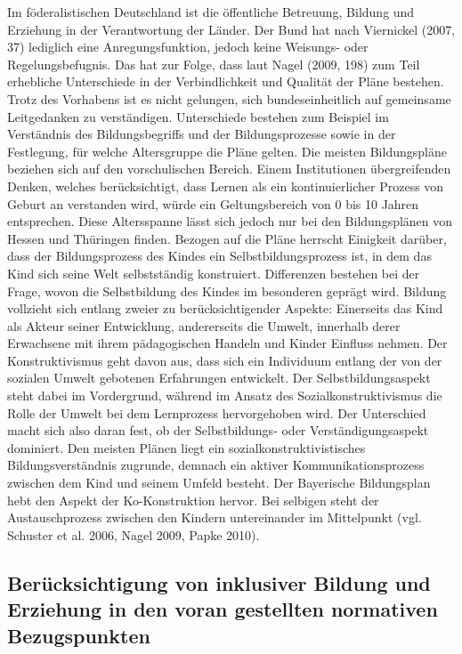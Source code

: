 Im föderalistischen Deutschland ist die öffentliche Betreuung, Bildung und Erziehung in der Verantwortung der Länder. Der Bund hat nach Viernickel (2007, 37) lediglich eine Anregungsfunktion, jedoch keine Weisungs- oder Regelungsbefugnis. Das hat zur Folge, dass laut Nagel (2009, 198) zum Teil erhebliche Unterschiede in der Verbindlichkeit und Qualität der Pläne bestehen. Trotz des Vorhabens ist es nicht gelungen, sich bundeseinheitlich auf gemeinsame Leitgedanken zu verständigen. Unterschiede bestehen zum Beispiel im Verständnis des Bildungsbegriffs und der Bildungsprozesse sowie in der Festlegung, für welche Altersgruppe die Pläne gelten. Die meisten Bildungspläne beziehen sich auf den vorschulischen Bereich. Einem Institutionen übergreifenden Denken, welches berücksichtigt, dass Lernen als ein kontinuierlicher Prozess von Geburt an verstanden wird, würde ein Geltungsbereich von 0 bis 10 Jahren entsprechen. Diese Altersspanne lässt sich jedoch nur bei den Bildungsplänen von Hessen und Thüringen finden.  
Bezogen auf die Pläne herrscht Einigkeit darüber, dass der Bildungsprozess des Kindes ein Selbstbildungsprozess ist, in dem das Kind sich seine Welt selbstständig konstruiert. Differenzen bestehen bei der Frage, wovon die Selbstbildung des Kindes im besonderen geprägt wird. Bildung vollzieht sich entlang zweier zu berücksichtigender Aspekte: Einerseits das Kind als Akteur seiner Entwicklung, andererseits die Umwelt, innerhalb derer Erwachsene mit ihrem pädagogischen Handeln und Kinder Einfluss nehmen. Der Konstruktivismus geht davon aus, dass sich ein Individuum entlang der von der sozialen Umwelt gebotenen Erfahrungen entwickelt. Der Selbstbildungsaspekt steht dabei im Vordergrund, während im Ansatz des Sozialkonstruktivismus die Rolle der Umwelt bei dem Lernprozess hervorgehoben wird. Der Unterschied macht sich also daran fest, ob der Selbstbildungs- oder Verständigungsaspekt dominiert. Den meisten Plänen liegt ein sozialkonstruktivistisches Bildungsverständnis zugrunde, demnach ein aktiver Kommunikationsprozess zwischen dem Kind und seinem Umfeld besteht. Der Bayerische Bildungsplan hebt den Aspekt der Ko-Konstruktion hervor. Bei selbigen steht der Austauschprozess zwischen den Kindern untereinander im Mittelpunkt (vgl. Schuster et al. 2006, Nagel 2009, Papke 2010).

\subsection{Berücksichtigung von inklusiver Bildung und Erziehung in den voran gestellten normativen Bezugspunkten}\label{kap:beruecksichtigung}

